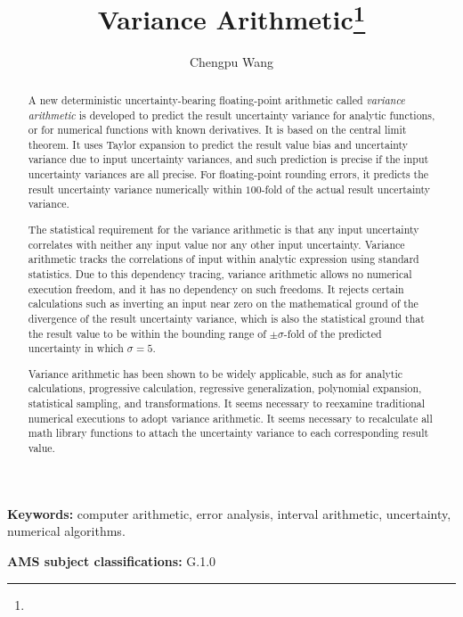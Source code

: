 \documentclass[twoside]{article}
\title{Variance Arithmetic\footnote{\whenaccepted}}
\author{Chengpu Wang
\institution{40 Grossman Street, Melville, NY 11747, USA}
\email{Chengpu@gmail.com}}
\date{}
\numberwithin{equation}{section}
\newcommand{\keywords}[1]{\small\textbf{Keywords: }#1}
\newcommand{\AMSsubj}[1]{\noindent\textbf{AMS subject classifications: }#1}
\begin{document}
\maketitle
\begin{abstract}

A new deterministic uncertainty-bearing floating-point arithmetic called \emph{variance arithmetic} is developed to predict the result uncertainty variance for analytic functions, or for numerical functions with known derivatives. 
It is based on the central limit theorem.
It uses Taylor expansion to predict the result value bias and uncertainty variance due to input uncertainty variances, and such prediction is precise if the input uncertainty variances are all precise.
For floating-point rounding errors, it predicts the result uncertainty variance numerically within $100$-fold of the actual result uncertainty variance.

The statistical requirement for the variance arithmetic is that any input uncertainty correlates with neither any input value nor any other input uncertainty. 
Variance arithmetic tracks the correlations of input within analytic expression using standard statistics.
Due to this dependency tracing, variance arithmetic allows no numerical execution freedom, and it has no dependency on such freedoms.
It rejects certain calculations such as inverting an input near zero on the mathematical ground of the divergence of the result uncertainty variance, which is also the statistical ground that the result value to be within the bounding range of $\pm \sigma$-fold of the predicted uncertainty in which $\sigma = 5$.

Variance arithmetic has been shown to be widely applicable, such as for analytic calculations, progressive calculation, regressive generalization, polynomial expansion, statistical sampling, and transformations.
It seems necessary to reexamine traditional numerical executions to adopt variance arithmetic.
It seems necessary to recalculate all math library functions to attach the uncertainty variance to each corresponding result value.

\end{abstract}
\keywords{computer arithmetic, error analysis, interval arithmetic, uncertainty, numerical algorithms.}

\AMSsubj{G.1.0}


\tableofcontents
\end{document}
